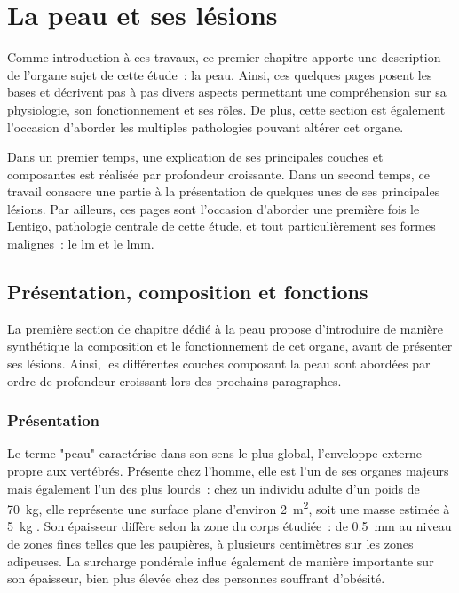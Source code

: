 \renewcommand{\thechapter}{\arabic{chapter}}
\setcounter{chapter}{0}

\chapter{La peau et ses lésions}
\label{chap:chapter_1}
\chapterintro
Comme introduction à ces travaux, ce premier chapitre apporte une description de l'organe sujet de cette étude~: la peau. Ainsi, ces quelques pages posent les bases et décrivent pas à pas divers aspects permettant une compréhension sur sa physiologie, son fonctionnement et ses rôles. De plus, cette section est également l'occasion d'aborder les multiples pathologies pouvant altérer cet organe.\par

Dans un premier temps, une explication de ses principales couches et composantes est réalisée par profondeur croissante. Dans un second temps, ce travail consacre une partie à la présentation de quelques unes de ses principales lésions. Par ailleurs, ces pages sont l'occasion d'aborder une première fois le Lentigo, pathologie centrale de cette étude, et tout particulièrement ses formes malignes~: le \acrlong{lm} et le \acrlong{lmm}.\par
\newpage

\section{Présentation, composition et fonctions}
La première section de chapitre dédié à la peau propose d'introduire de manière synthétique la composition et le fonctionnement de cet organe, avant de présenter ses lésions. Ainsi, les différentes couches composant la peau sont abordées par ordre de profondeur croissant lors des prochains paragraphes.\par

\subsection{Présentation}
Le terme "peau" caractérise dans son sens le plus global, l’enveloppe externe propre aux vertébrés. Présente chez l’homme, elle est l’un de ses organes majeurs mais également l’un des plus lourds~: chez un individu adulte d’un poids de \SI{70}{\kilo\gram}, elle représente une surface plane d’environ \SI{2}{\metre\squared}, soit une masse estimée à \SI{5}{\kilo\gram} \cite{McGrath2010}. Son épaisseur diffère selon la zone du corps étudiée~: de \SI{0,5}{\milli\metre} au niveau de zones fines telles que les paupières, à plusieurs centimètres sur les zones adipeuses. La surcharge pondérale influe également de manière importante sur son épaisseur, bien plus élevée chez des personnes souffrant d'obésité.\par


